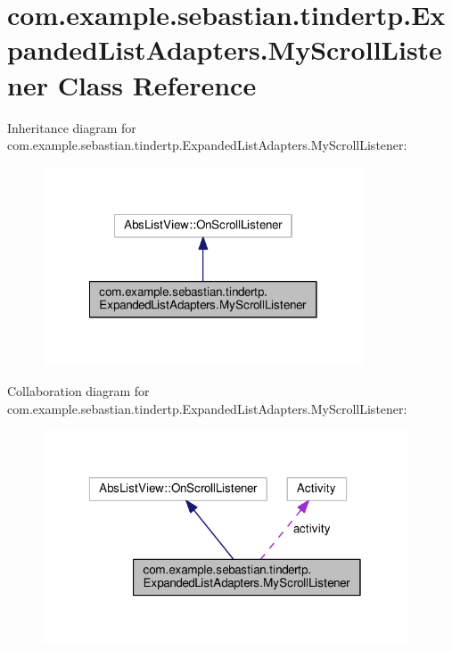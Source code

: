 \hypertarget{classcom_1_1example_1_1sebastian_1_1tindertp_1_1ExpandedListAdapters_1_1MyScrollListener}{}\section{com.\+example.\+sebastian.\+tindertp.\+Expanded\+List\+Adapters.\+My\+Scroll\+Listener Class Reference}
\label{classcom_1_1example_1_1sebastian_1_1tindertp_1_1ExpandedListAdapters_1_1MyScrollListener}


Inheritance diagram for com.\+example.\+sebastian.\+tindertp.\+Expanded\+List\+Adapters.\+My\+Scroll\+Listener\+:
\nopagebreak
\begin{figure}[H]
\begin{center}
\leavevmode
\includegraphics[width=270pt]{classcom_1_1example_1_1sebastian_1_1tindertp_1_1ExpandedListAdapters_1_1MyScrollListener__inherit__graph}
\end{center}
\end{figure}


Collaboration diagram for com.\+example.\+sebastian.\+tindertp.\+Expanded\+List\+Adapters.\+My\+Scroll\+Listener\+:
\nopagebreak
\begin{figure}[H]
\begin{center}
\leavevmode
\includegraphics[width=307pt]{classcom_1_1example_1_1sebastian_1_1tindertp_1_1ExpandedListAdapters_1_1MyScrollListener__coll__graph}
\end{center}
\end{figure}
